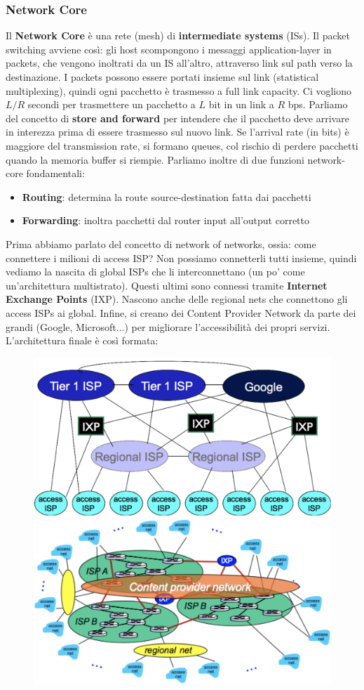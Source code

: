 \documentclass[11pt]{article}
\begin{document}
\subsubsection{Network Core}
Il \textbf{Network Core} è una rete (mesh) di \textbf{intermediate systems} (ISs). Il packet switching avviene così: gli host scompongono i messaggi application-layer in packets, che vengono inoltrati da un IS all'altro, attraverso link sul path verso la destinazione. I packets possono essere portati insieme sul link (statistical multiplexing), quindi ogni pacchetto è trasmesso a full link capacity. Ci vogliono $L/R$ secondi per trasmettere un pacchetto a $L$ bit in un link a $R$ bps. Parliamo del concetto di \textbf{store and forward} per intendere che il pacchetto deve arrivare in interezza prima di essere trasmesso sul nuovo link. 
Se l'arrival rate (in bits) è maggiore del transmission rate, si formano queues, col rischio di perdere pacchetti quando la memoria buffer si riempie. Parliamo inoltre di due funzioni network-core fondamentali:
\begin{itemize}
    \item \textbf{Routing}: determina la route source-destination fatta dai pacchetti
    \item \textbf{Forwarding}: inoltra pacchetti dal router input all'output corretto 
\end{itemize} 
Prima abbiamo parlato del concetto di network of networks, ossia: come connettere i milioni di access ISP? Non possiamo connetterli tutti insieme, quindi vediamo la nascita di global ISPs che li interconnettano (un po' come un'architettura multistrato). Questi ultimi sono connessi tramite \textbf{Internet Exchange Points} (IXP). Nascono anche delle regional nets che connettono gli access ISPs ai global. Infine, si creano dei Content Provider Network da parte dei grandi (Google, Microsoft...) per migliorare l'accessibilità dei propri servizi. L'architettura finale è così formata:
\begin{figure}[H]
    \centering
    \includegraphics[width=0.45\linewidth]{res/ISPs1.png}
    \includegraphics[width=0.45\linewidth]{res/ISPs2.png}
\end{figure}
\end{document}

